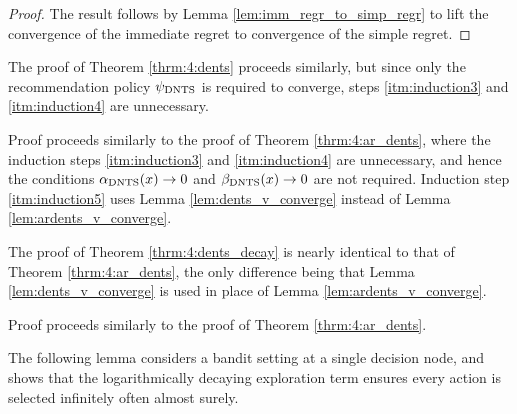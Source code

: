 \begin{proof}
        The result follows by Lemma \ref{lem:imm_regr_to_simp_regr} to lift the convergence of the immediate regret to convergence of the simple regret.
    \end{proof}

    \proofsep



    
    The proof of Theorem \ref{thrm:4:dents} proceeds similarly, but since only the recommendation policy ${\psi_{{\textnormal{DNTS}}}}$ is required to converge, steps \ref{itm:induction3} and \ref{itm:induction4} are unnecessary.

    \thrmDENTS*
    \begin{proofoutline}
        Proof proceeds similarly to the proof of Theorem \ref{thrm:4:ar_dents}, where the induction steps \ref{itm:induction3} and \ref{itm:induction4} are unnecessary, and hence the conditions ${\alpha_{{\textnormal{DNTS}}}}(x)\rightarrow 0$ and ${\beta_{{\textnormal{DNTS}}}}(x)\rightarrow 0$ are not required. Induction step \ref{itm:induction5} uses Lemma \ref{lem:dents_v_converge} instead of Lemma \ref{lem:ardents_v_converge}.
    \end{proofoutline}

    \proofsep



    The proof of Theorem \ref{thrm:4:dents_decay} is nearly identical to that of Theorem \ref{thrm:4:ar_dents}, the only difference being that Lemma \ref{lem:dents_v_converge} is used in place of Lemma \ref{lem:ardents_v_converge}.    

    \thrmDENTSdecay*
    \begin{proofoutline}
        Proof proceeds similarly to the proof of Theorem \ref{thrm:4:ar_dents}.
    \end{proofoutline}

    \proofsep



    

    The following lemma considers a bandit setting at a single decision node, and shows that the logarithmically decaying exploration term ensures every action is selected infinitely often almost surely.


